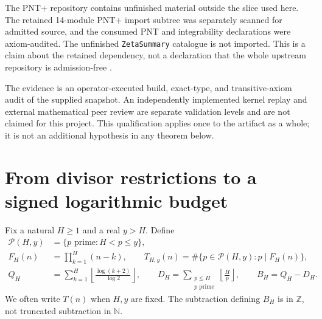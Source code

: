 \documentclass[11pt,a4paper]{article}
\theoremstyle{definition}
\theoremstyle{remark}
\numberwithin{equation}{section}
\newcommand{\N}{\mathbb N}
\newcommand{\Z}{\mathbb Z}
\newcommand{\Pset}{\mathcal P}
\newcommand{\floor}[1]{\left\lfloor #1\right\rfloor}
\begin{document}
The PNT+ repository contains unfinished material outside the slice used here.
The retained 14-module PNT+ import subtree was separately scanned for admitted
source, and the consumed PNT and integrability declarations were axiom-audited.
The unfinished \texttt{ZetaSummary} catalogue is not imported. This is a claim
about the retained dependency, not a declaration that the whole upstream
repository is admission-free \citep{PNTPlus}.

The evidence is an operator-executed build, exact-type, and transitive-axiom
audit of the supplied snapshot. An independently implemented kernel replay and
external mathematical peer review are separate validation levels and are not
claimed for this project. This qualification applies once to the artifact as
a whole; it is not an additional hypothesis in any theorem below.

\section{From divisor restrictions to a signed logarithmic budget}\label{sec:budget}
Fix a natural $H\ge1$ and a real $y>H$. Define
\begin{align}
 \Pset(H,y)&=\{p\text{ prime}:H<p\le y\},\label{eq:prime-set}\\
 F_H(n)&=\prod_{k=1}^H(n-k),\qquad
 T_{H,y}(n)=\#\{p\in\Pset(H,y):p\mid F_H(n)\},\label{eq:hit}\\
 Q_H&=\sum_{k=1}^H\floor{\frac{\log(k+2)}{\log2}},\qquad
 D_H=\sum_{\substack{p\le H\\p\text{ prime}}}\floor{\frac Hp},\qquad
 B_H=Q_H-D_H.\label{eq:budget-def}
\end{align}
We often write $T(n)$ when $H,y$ are fixed. The subtraction defining $B_H$ is
in $\Z$, not truncated subtraction in $\N$.
\end{document}
